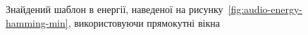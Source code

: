 \begin{figure}[!h]

            \caption{Знайдений шаблон в енергії, наведеної на рисунку~\ref{fig:audio-energy-hamming-min}, використовуючи
                прямокутні вікна}\label{fig:matched-energy-hamming-min-rect}
        \end{figure}
        \clearpage
